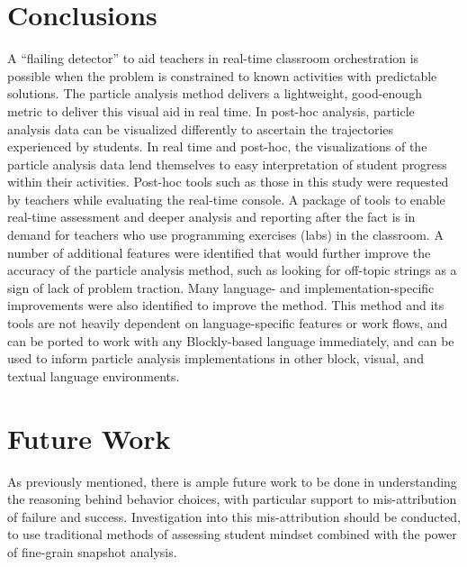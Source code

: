 \section{Conclusions}
\label{sec:conclusions}
A ``flailing detector'' to aid teachers in real-time classroom orchestration is possible when the problem is constrained to known activities with predictable solutions. The particle analysis method delivers a lightweight, good-enough metric to deliver this visual aid in real time. In post-hoc analysis, particle analysis data can be visualized differently to ascertain the trajectories experienced by students. In real time and post-hoc, the visualizations of the particle analysis data lend themselves to easy interpretation of student progress within their activities. Post-hoc tools such as those in this study were requested by teachers while evaluating the real-time console. A package of tools to enable real-time assessment and deeper analysis and reporting after the fact is in demand for teachers who use programming exercises (labs) in the classroom. A number of additional features were identified that would further improve the accuracy of the particle analysis method, such as looking for off-topic strings as a sign of lack of problem traction. Many language- and implementation-specific improvements were also identified to improve the method. This method and its tools are not heavily dependent on language-specific features or work flows, and can be ported to work with any Blockly-based language immediately, and can be used to inform particle analysis implementations in other block, visual, and textual language environments.



\section{Future Work}
\label{sec:futurework}

As previously mentioned, there is ample future work to be done in understanding the reasoning behind behavior choices, with particular support to mis-attribution of failure and success. Investigation into this mis-attribution should be conducted, to use traditional methods of assessing student mindset combined with the power of fine-grain snapshot analysis. 

